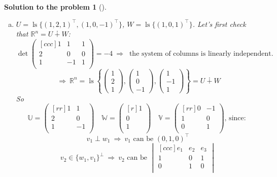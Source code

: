 \documentclass[12pt,a4]{article}
\newtheorem{solution}{Solution to the problem}
\newcommand\ls{\operatorname{ls}}
\newcommand{\bR}{{\mathbb R}}
\newcommand{\bU}{{\mathbb U}}
\newcommand{\bW}{{\mathbb W}}
\newcommand{\bV}{{\mathbb V}}
\newcommand{\answer}[1]{\textbf{Answer:} #1}
\begin{document}
{\begin{solution}[]
\begin{enumerate}[(a)]
\[\]
\answer{$P = \frac12
\begin{pmatrix}[rrr]
1 & -1 & 1 \\
0 & 0 & 0 \\
1 & -1 & 1
\end{pmatrix}$}
	\item
$U =\ls \{(1,2,1)^\top, (1,0,-1)^\top\}$, $W = \ls\{(1,0,1)^\top\}$.
Let's first check that $\bR^n = U \dotplus W$:
\[
\det 
\begin{pmatrix}[ccc]
1 & 1 & 1 \\
2 & 0 & 0 \\
1 & -1 & 1 \\
\end{pmatrix}
= - 4  ~ \Rightarrow ~ 
 \text{ the system of columns is linearly independent.}
 \]
 \[
 ~ \Rightarrow ~ 
\bR^n = 
\ls \left \{
\begin{pmatrix}1\\2\\1\end{pmatrix}, 
\begin{pmatrix}1\\0\\-1\end{pmatrix},
\begin{pmatrix}1\\-1\\1\end{pmatrix}
\right \} = U \dotplus W
\]
So
\[
\bU =
\begin{pmatrix}[rr]
1 & 1 \\
2 & 0 \\
1 & -1 \\
\end{pmatrix}
\quad
\bW =
\begin{pmatrix}[r]
1 \\ 0 \\ 1 \\
\end{pmatrix}
\quad
\bV = 
\begin{pmatrix}[rr]
0 & -1 \\
1 & 0 \\
0 & 1 \\
\end{pmatrix}
\text{, since: }
\]
\[
v_1 \perp w_1
~\Rightarrow~
v_1 \text{ can be } (0, 1, 0)^\top
\]
\[
v_2 \in \{w_1, v_1\}^\perp 
~\Rightarrow~ 
v_2 \text{ can be }
\begin{vmatrix}[ccc]
e_1 & e_2 & e_3\\
1 & 0 & 1\\
0 & 1 & 0 \\

\end{vmatrix}\]
\end{enumerate}
\end{solution}}
\end{document}
